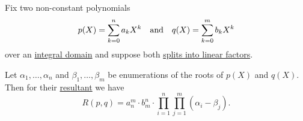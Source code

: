 \begin{proposition}\label{thm:resultant_as_product}
  Fix two non-constant polynomials
  \begin{align*}
    p(X) = \sum_{k=0}^n a_k X^k
    &&\T{and}&&
    q(X) = \sum_{k=0}^m b_k X^k
  \end{align*}
  over an \hyperref[def:integral_domain]{integral domain} and suppose both \hyperref[def:polynomial_splits_into_linear_factors]{splits into linear factors}.

  Let \( \alpha_1, \ldots, \alpha_n \) and \( \beta_1, \ldots, \beta_m \) be enumerations of the roots of \( p(X) \) and \( q(X) \). Then for their \hyperref[def:resultant]{resultant} we have
  \begin{equation}\label{eq:thm:resultant_as_product}
    R(p, q) = a_n^m \cdot b_m^n \cdot \prod_{i=1}^n \prod_{j=1}^m (\alpha_i - \beta_j).
  \end{equation}
\end{proposition}
